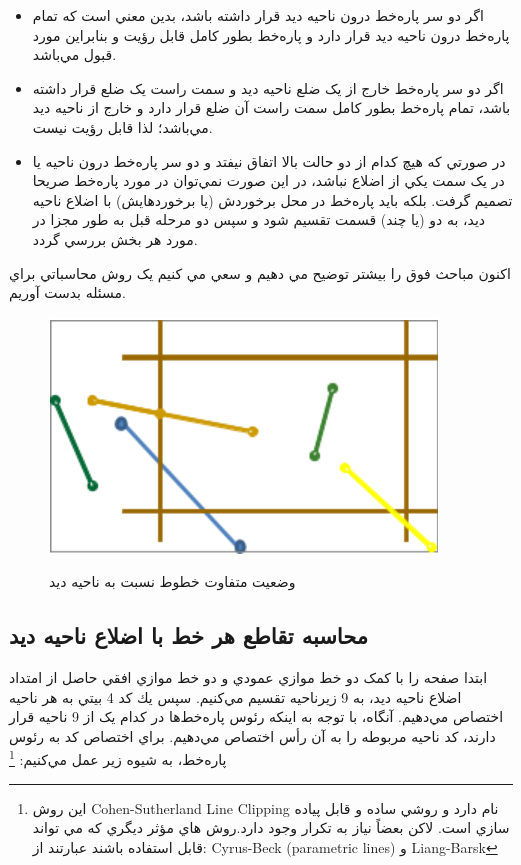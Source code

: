 \documentclass{book}
\begin{document}
\begin{itemize}
    \item
    اگر دو سر پاره‌خط درون ناحيه ديد قرار داشته باشد، بدين معني است که  تمام پاره‌خط درون ناحيه ديد قرار دارد و پاره‌خط بطور کامل قابل رؤيت و بنابراين مورد قبول مي‌باشد.
    \item
    اگر دو سر پاره‌خط خارج از يک ضلع ناحيه ديد و سمت راست يک ضلع قرار داشته باشد، تمام پاره‌خط بطور کامل سمت راست آن ضلع قرار دارد و خارج از ناحيه ديد مي‌باشد؛ لذا قابل رؤيت نيست.
    \item
    در صورتي که هيچ کدام از دو حالت بالا اتفاق نيفتد و دو سر پاره‌خط درون ناحيه يا در يک سمت يکي از اضلاع نباشد، در اين صورت نمي‌توان در مورد پاره‌خط صريحا تصميم گرفت. بلکه بايد پاره‌خط در محل برخوردش (يا برخوردهايش) با اضلاع ناحيه ديد، به دو (يا چند) قسمت تقسيم شود و سپس دو مرحله قبل به طور مجزا در مورد هر بخش بررسي گردد. 
\end{itemize}

اکنون مباحث فوق را بيشتر توضيح مي دهيم و سعي مي کنيم يک روش محاسباتي براي مسئله بدست آوريم. 

\begin{figure}[h!]
    \begin{center}
        \includegraphics[width=\linewidth]{sq_crop.png}
        \label{sq_crop}
        \caption{وضعيت متفاوت خطوط نسبت به ناحيه ديد}
    \end{center}
\end{figure}


\subsection{محاسبه تقاطع هر خط با اضلاع ناحيه ديد}

ابتدا صفحه را با کمک دو خط موازي عمودي و دو خط موازي افقي حاصل از امتداد اضلاع ناحيه ديد، به 9 زيرناحيه تقسيم مي‌کنيم. سپس يك كد 4 بيتي به هر ناحيه اختصاص مي‌دهيم. آنگاه، با توجه به اينکه رئوس پاره‌خط‌ها در کدام‌ يک از 9 ناحيه قرار دارند، کد ناحيه مربوطه را به آن رأس اختصاص مي‌دهيم. براي اختصاص کد به رئوس پاره‌خط، به شيوه زير عمل مي‌کنيم: \footnote{ اين روش  Cohen-Sutherland Line Clipping نام دارد و روشي ساده و قابل پياده سازي است. لاكن بعضاً نياز به تكرار وجود دارد.روش هاي مؤثر ديگري که مي تواند قابل استفاده باشند عبارتند از: Cyrus-Beck  (parametric lines) و Liang-Barsk }
\end{document}
